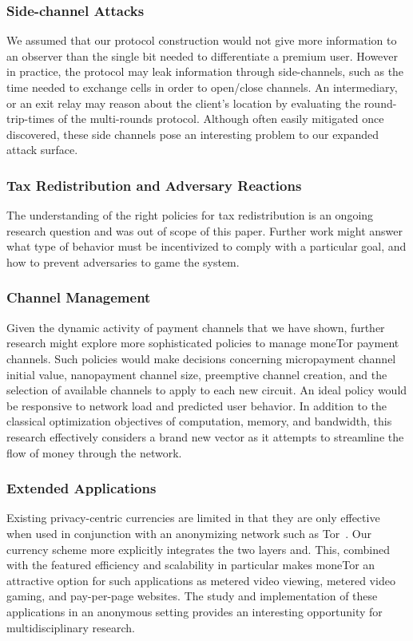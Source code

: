 \subsubsection{Side-channel Attacks} We assumed that our protocol construction would
not give more information to an observer than the single bit needed to
differentiate a premium user. However in practice, the protocol may leak
information through side-channels, such as the time needed to exchange cells in
order to open/close channels. An intermediary, or an exit relay may reason about
the client's location by evaluating the round-trip-times of the multi-rounds
protocol. Although often easily mitigated once discovered, these side channels
pose an interesting problem to our expanded attack surface.

\subsubsection{Tax Redistribution and Adversary Reactions}
The understanding of the right policies for tax redistribution is an ongoing research question and was out of scope of this paper. Further work might answer what type of behavior must be incentivized to comply with a particular goal, and how to prevent adversaries to game the system. 

\subsubsection{Channel Management} Given the dynamic activity of payment
channels that we have shown, further research might explore more sophisticated
policies to manage moneTor payment channels. Such policies would make decisions
concerning micropayment channel initial value, nanopayment channel size,
preemptive channel creation, and the selection of available channels to apply to
each new circuit. An ideal policy would be responsive to network load and
predicted user behavior. In addition to the classical optimization objectives of
computation, memory, and bandwidth, this research effectively considers a brand
new vector as it attempts to streamline the flow of money through the network.

\subsubsection{Extended Applications} Existing privacy-centric currencies are
limited in that they are only effective when used in conjunction with an
anonymizing network such as Tor~\cite{sasson2014zerocash}. Our currency scheme
more explicitly integrates the two layers and. This, combined with the featured
efficiency and scalability in particular makes moneTor an attractive option for
such applications as metered video viewing, metered video gaming, and
pay-per-page websites. The study and implementation of these applications in an
anonymous setting provides an interesting opportunity for multidisciplinary
research.
